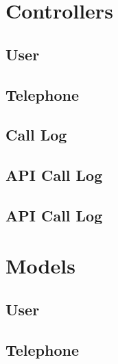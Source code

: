 \chapter{Controllers}\label{bijlage_controllers}
\section{User}\label{bij_con_user}


\section{Telephone}\label{bij_con_telephone}


\section{Call Log}\label{bij_con_calllog}


\section{API Call Log}\label{bij_api_con_call_log}


\section{API Call Log}\label{bij_ms_con_call_log}


\chapter{Models}\label{bijlage_models}
\section{User}\label{bij_model_user}


\section{Telephone}\label{bij_model_telephone}


